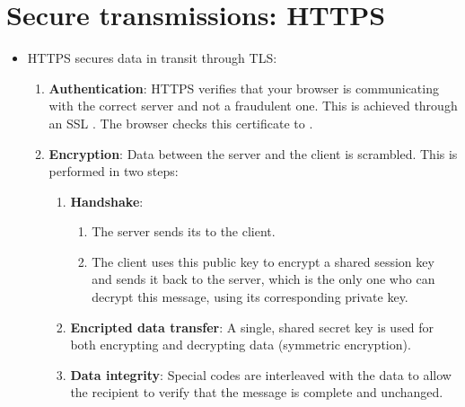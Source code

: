 \section{Secure transmissions: \gls{HTTPS}}
\begin{itemize}
\item \gls{HTTPS} secures data in transit through \gls{TLS}:
  \begin{enumerate}
  \item \textbf{Authentication}: \gls{HTTPS} verifies that your
    browser is communicating with the correct server and not a
    fraudulent one. This is achieved through an \gls{SSL}
    . The browser checks this
    certificate to .
  \item \textbf{Encryption}: Data between the server and the client is
    scrambled. This is performed in two steps:
    \begin{enumerate}
    \item \textbf{Handshake}:
      \begin{enumerate}
      \item The server sends its  to the client.
      \item The client uses this public key to encrypt a shared
        session key and sends it back to the server, which is the only
        one who can decrypt this message, using its corresponding
        private key.
      \end{enumerate}
    \item \textbf{Encripted data transfer}: A single, shared secret
      key is used for both encrypting and decrypting data (symmetric
      encryption).
    \item \textbf{Data integrity}: Special codes are interleaved with
      the data to allow the recipient to verify that the message is
      complete and unchanged.
    \end{enumerate}
  \end{enumerate}
\end{itemize}

